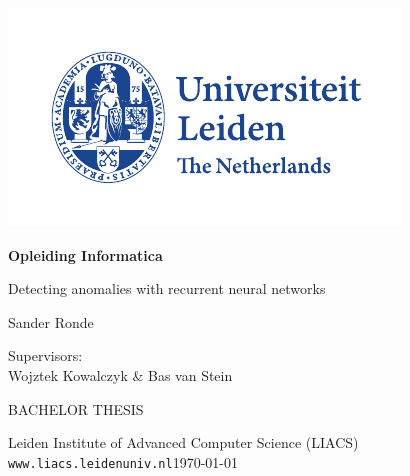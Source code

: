 \thispagestyle{empty}

\includegraphics{logoleiden}

\vspace{-2.5cm}\hfill \begin{huge}\textbf{Opleiding Informatica}\end{huge}

\vspace{5cm}
\begin{Large}
\hfill Detecting anomalies with recurrent neural networks

\vspace*{25mm}

\hfill Sander Ronde
\end{Large}

\vspace*{4.5cm}

\begin{large}

Supervisors:\\
Wojztek Kowalczyk \& Bas van Stein


\vspace*{2.8cm}
BACHELOR THESIS

\vspace*{5mm}
Leiden Institute of Advanced Computer Science (LIACS)\\
\texttt{www.liacs.leidenuniv.nl}\hfill \today
\end{large}

